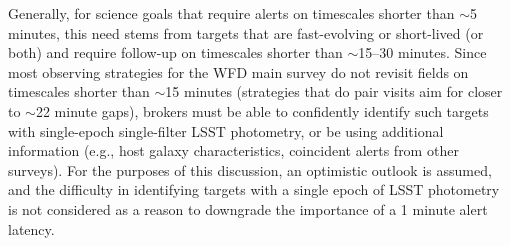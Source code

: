 \documentclass[DM,lsstdraft,authoryear,toc]{lsstdoc}
\begin{document}
Generally, for science goals that require alerts on timescales shorter than $\sim$5 minutes, this need stems from targets that are fast-evolving or short-lived (or both) and require follow-up on timescales shorter than $\sim$15--30 minutes.
Since most observing strategies for the WFD main survey do not revisit fields on timescales shorter than $\sim$15 minutes (strategies that do pair visits aim for closer to $\sim$22 minute gaps), brokers must be able to confidently identify such targets with single-epoch single-filter LSST photometry, or be using additional information (e.g., host galaxy characteristics, coincident alerts from other surveys).
For the purposes of this discussion, an optimistic outlook is assumed, and the difficulty in identifying targets with a single epoch of LSST photometry is not considered as a reason to downgrade the importance of a 1 minute alert latency.
\end{document}
